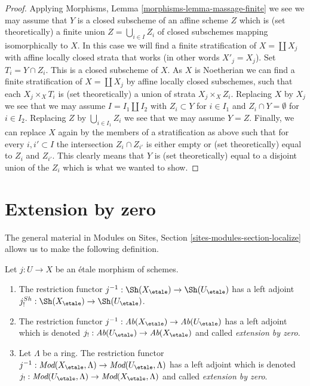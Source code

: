 \begin{proof}
\medskip\noindent
Applying Morphisms, Lemma \ref{morphisms-lemma-massage-finite}
we see we may assume that $Y$ is a closed subscheme of an
affine scheme $Z$ which is (set theoretically) a finite union
$Z = \bigcup_{i \in I} Z_i$ of closed subschemes mapping isomorphically
to $X$. In this case we will find a finite stratification of $X = \coprod X_j$
with affine locally closed strata that works (in other words $X'_j = X_j$).
Set $T_i = Y \cap Z_i$. This is a closed subscheme of $X$.
As $X$ is Noetherian we can find a finite stratification of $X = \coprod X_j$
by affine locally closed subschemes, such that each
$X_j \times_X T_i$ is (set theoretically) a union of strata $X_j \times_X Z_i$.
Replacing $X$ by $X_j$ we see that we may assume $I = I_1 \amalg I_2$
with $Z_i \subset Y$ for $i \in I_1$ and $Z_i \cap Y = \emptyset$ for
$i \in I_2$. Replacing $Z$ by $\bigcup_{i \in I_1} Z_i$ we see that we
may assume $Y = Z$.
Finally, we can replace $X$ again by the members of a stratification
as above such that for every $i, i' \subset I$ the intersection
$Z_i \cap Z_{i'}$ is either empty or (set theoretically) equal
to $Z_i$ and $Z_{i'}$. This clearly means that $Y$ is (set theoretically)
equal to a disjoint union of the $Z_i$ which is what we wanted to show.
\end{proof}









\section{Extension by zero}
\label{section-extension-by-zero}

\noindent
The general material in
Modules on Sites, Section \ref{sites-modules-section-localize}
allows us to make the following definition.

\begin{definition}
\label{definition-extension-zero}
Let $j : U \to X$ be an \'etale morphism of schemes.
\begin{enumerate}
\item The restriction functor
$j^{-1} : \Sh(X_\etale) \to \Sh(U_\etale)$
has a left adjoint
$j_!^{Sh} : \Sh(X_\etale) \to \Sh(U_\etale)$.
\item The restriction functor
$j^{-1} : \textit{Ab}(X_\etale) \to \textit{Ab}(U_\etale)$
has a left adjoint which is denoted
$j_! : \textit{Ab}(U_\etale) \to \textit{Ab}(X_\etale)$
and called {\it extension by zero}.
\item Let $\Lambda$ be a ring. The restriction functor
$j^{-1} : \textit{Mod}(X_\etale, \Lambda) \to
\textit{Mod}(U_\etale, \Lambda)$
has a left adjoint which is denoted
$j_! : \textit{Mod}(U_\etale, \Lambda) \to
\textit{Mod}(X_\etale, \Lambda)$
and called {\it extension by zero}.
\end{enumerate}
\end{definition}

